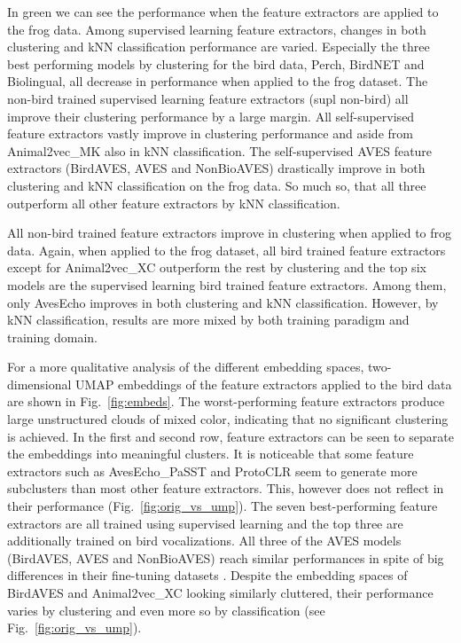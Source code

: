 In green we can see the performance when the feature extractors are applied to the frog data.
Among supervised learning feature extractors, changes in both clustering and kNN classification performance are varied.
Especially the three best performing models by clustering for the bird data, Perch, BirdNET and Biolingual, all decrease in performance when applied to the frog dataset.
The non-bird trained supervised learning feature extractors (supl non-bird) all improve their clustering performance by a large margin.
All self-supervised feature extractors vastly improve in clustering performance and aside from Animal2vec\_MK also in kNN classification.
The self-supervised AVES feature extractors (BirdAVES, AVES and NonBioAVES) drastically improve in both clustering and kNN classification on the frog data.
So much so, that all three outperform all other feature extractors by kNN classification.

All non-bird trained feature extractors improve in clustering when applied to frog data.
Again, when applied to the frog dataset, all bird trained feature extractors except for Animal2vec\_XC outperform the rest by clustering and the top six models are the supervised learning bird trained feature extractors.
Among them, only AvesEcho improves in both clustering and kNN classification.
However, by kNN classification, results are more mixed by both training paradigm and training domain.


For a more qualitative analysis of the different embedding spaces, two-dimensional UMAP embeddings of the feature extractors applied to the bird data are shown in Fig.~\ref{fig:embeds}.
The worst-performing feature extractors produce large unstructured clouds of mixed color, indicating that no significant clustering is achieved.
In the first and second row, feature extractors can be seen to separate the embeddings into meaningful clusters.
It is noticeable that some feature extractors such as AvesEcho\_PaSST and ProtoCLR seem to generate more subclusters than most other feature extractors.
This, however does not reflect in their performance (Fig.~\ref{fig:orig_vs_ump}).
The seven best-performing feature extractors are all trained using supervised learning and the top three are additionally trained on bird vocalizations.
All three of the AVES models (BirdAVES, AVES and NonBioAVES) reach similar performances in spite of big differences in their fine-tuning datasets \cite{hagiwara_aves_2022}.
Despite the embedding spaces of BirdAVES and Animal2vec\_XC looking similarly cluttered, their performance varies by clustering and even more so by classification (see Fig.~\ref{fig:orig_vs_ump}).


